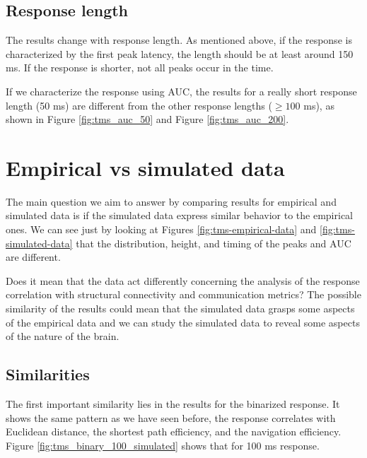 \subsection{Response length}

The results change with response length. As mentioned above, if the response is characterized by the first peak latency, the length should be at least around 150 ms. If the response is shorter, not all peaks occur in the time. 

If we characterize the response using AUC, the results for a really short response length (50 ms) are different from the other response lengths ($\geq100$ ms), as shown in Figure \ref{fig:tms_auc_50} and Figure \ref{fig:tms_auc_200}.

\section{Empirical vs simulated data}

The main question we aim to answer by comparing results for empirical and simulated data is if the simulated data express similar behavior to the empirical ones. We can see just by looking at Figures \ref{fig:tms-empirical-data} and \ref{fig:tms-simulated-data} that the distribution, height, and timing of the peaks and AUC are different. 

Does it mean that the data act differently concerning the analysis of the response correlation with structural connectivity and communication metrics? The possible similarity of the results could mean that the simulated data grasps some aspects of the empirical data and we can study the simulated data to reveal some aspects of the nature of the brain.

\subsection{Similarities}

The first important similarity lies in the results for the binarized response. It shows the same pattern as we have seen before, the response correlates with Euclidean distance, the shortest path efficiency, and the navigation efficiency. Figure \ref{fig:tms_binary_100_simulated} shows that for 100 ms response. 

